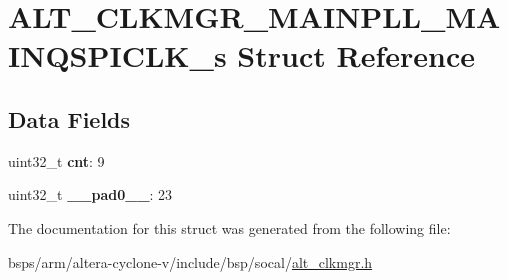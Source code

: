 \hypertarget{structALT__CLKMGR__MAINPLL__MAINQSPICLK__s}{}\section{A\+L\+T\+\_\+\+C\+L\+K\+M\+G\+R\+\_\+\+M\+A\+I\+N\+P\+L\+L\+\_\+\+M\+A\+I\+N\+Q\+S\+P\+I\+C\+L\+K\+\_\+s Struct Reference}
\label{structALT__CLKMGR__MAINPLL__MAINQSPICLK__s}
\subsection*{Data Fields}
\begin{DoxyCompactItemize}
\item 
\mbox{\label{structALT__CLKMGR__MAINPLL__MAINQSPICLK__s_a1a9656e9a21e2e1352a498c683de473c}} 
uint32\+\_\+t {\bfseries cnt}\+: 9
\item 
\mbox{\label{structALT__CLKMGR__MAINPLL__MAINQSPICLK__s_ae9f35554ddf1ea991b1992599f462bee}} 
uint32\+\_\+t {\bfseries \+\_\+\+\_\+pad0\+\_\+\+\_\+}\+: 23
\end{DoxyCompactItemize}


The documentation for this struct was generated from the following file\+:\begin{DoxyCompactItemize}
\item 
bsps/arm/altera-\/cyclone-\/v/include/bsp/socal/\mbox{\hyperlink{alt__clkmgr_8h}{alt\+\_\+clkmgr.\+h}}\end{DoxyCompactItemize}
